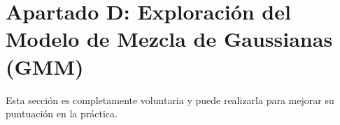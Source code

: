 \chapter{Apartado D: \textbf{Exploración del Modelo de Mezcla de Gaussianas (GMM)}}
\label{chapter:tarea_d}

Esta sección es completamente voluntaria y puede realizarla para mejorar su puntuación en la práctica.

\vspace{5mm}
\begin{tcolorbox}[colback=gray!10, colframe=gray!30, coltitle=black, title=Pregunta D.1, halign=left]
\end{tcolorbox}